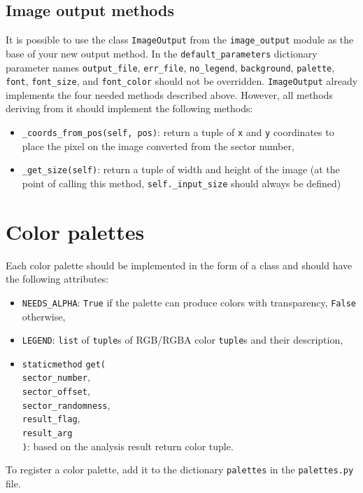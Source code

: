 \documentclass[
  digital, %
  color,   %
  oneside, %
  lof,     %
  nolot,     %
]{fithesis4}
\begin{document}
\subsection{Image output methods}
It is possible to use the class \texttt{ImageOutput} from the \texttt{image\_output} module as the base of your new output method.
In the \texttt{default\_parameters} dictionary parameter names \texttt{output\_file}, \texttt{err\_file}, \texttt{no\_legend}, \texttt{background}, \texttt{palette}, \texttt{font}, \texttt{font\_size}, and \texttt{font\_color} should not be overridden.
\texttt{ImageOutput} already implements the four needed methods described above.
However, all methods deriving from it should implement the following methods:
\begin{itemize}
  \item \texttt{\_coords\_from\_pos(self, pos)}: return a tuple of \texttt{x} and \texttt{y} coordinates to place the pixel on the image converted from the sector number,
  \item \texttt{\_get\_size(self)}: return a tuple of width and height of the image (at the point of calling this method, \texttt{self.\_input\_size} should always be defined)
\end{itemize}

\section{Color palettes}
Each color palette should be implemented in the form of a class and should have the following attributes:
\begin{itemize}
  \item \texttt{NEEDS\_ALPHA}: \texttt{True} if the palette can produce colors with transparency, \texttt{False} otherwise,
  \item \texttt{LEGEND}: \texttt{list} of \texttt{tuple}s of RGB/RGBA color \texttt{tuple}s and their description,
  \item \texttt{staticmethod} \texttt{get(}\\\-\hspace{.5cm}\texttt{sector\_number}, \\\-\hspace{.5cm}\texttt{sector\_offset}, \\\-\hspace{.5cm}\texttt{sector\_randomness}, \\\-\hspace{.5cm}\texttt{result\_flag}, \\\-\hspace{.5cm}\texttt{result\_arg}\\\texttt{)}: based on the analysis result return color tuple.
\end{itemize}
To register a color palette, add it to the dictionary \texttt{palettes} in the \texttt{palettes.py} file.
\end{document}
